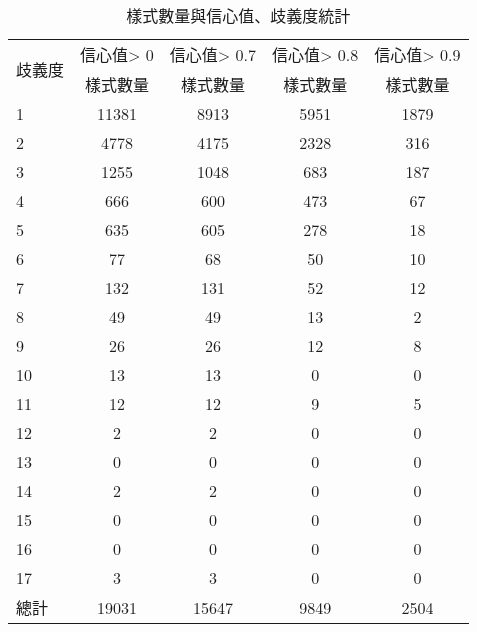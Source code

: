 \begin{table}[t]
    \begin{center}
        \small
        \begin{tabular}{|l||c|c|c|c|}
        \hline
        \multirow{2}{*}{歧義度} & 信心值> 0 & 信心值> 0.7 & 信心值> 0.8 & 信心值> 0.9\\
          & 樣式數量 & 樣式數量 & 樣式數量 & 樣式數量 \\
        \hline
        1 & 11381 & 8913 & 5951 & 1879 \\
        2 & 4778 & 4175 & 2328 & 316 \\
        3 & 1255 & 1048 & 683 & 187 \\
        4 & 666 & 600 & 473 & 67 \\
        5 & 635 & 605 & 278 & 18 \\
        6 & 77 & 68 & 50 & 10 \\
        7 & 132 & 131 & 52 & 12 \\
        8 & 49 & 49 & 13 & 2 \\
        9 & 26 & 26 & 12 & 8 \\
        10 & 13 & 13 & 0 & 0 \\
        11 & 12 & 12 & 9 & 5 \\
        12 & 2 & 2 & 0 & 0 \\
        13 & 0 & 0 & 0 & 0 \\
        14 & 2 & 2 & 0 & 0 \\
        15 & 0 & 0 & 0 & 0 \\
        16 & 0 & 0 & 0 & 0 \\
        17 & 3 & 3 & 0 & 0 \\
        \hline
        總計 & 19031 & 15647 & 9849 & 2504 \\
        \hline
        \end{tabular}
        \caption{樣式數量與信心值、歧義度統計}
        \label{t:yago-degree}
    \end{center}
\end{table}
